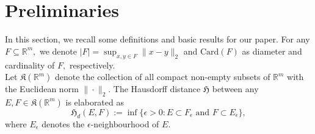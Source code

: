 \documentclass{amsproc}
\theoremstyle{definition}
\newtheorem{definition}[theorem]{Definition}
\theoremstyle{remark}
\numberwithin{equation}{section}
\begin{document}
\section{Preliminaries} \label{Sec2}
In this section, we recall some definitions and basic results for our paper. For any $F\subseteq\mathbb{R}^m,$ we denote $|F|=\sup_{x,y\in F}\|x-y\|_2$ and $\text{Card}(F)$ as diameter and cardinality of $F,$ respectively. \\
Let $\mathfrak{K}(\mathbb{R}^m)$ denote the collection of all compact non-empty subsets of $\mathbb{R}^m$ with the Euclidean norm $\|\cdot\|_2$. The Hausdorff distance $\mathfrak{H}$ between any $E,F\in\mathfrak{K}(\mathbb{R}^m)$ is elaborated as 
$$\mathfrak{H}_d(E,F):=\inf\{\epsilon>0: E\subset F_\epsilon \text{ and } F\subset E_\epsilon\},$$ where $E_\epsilon$ denotes the $\epsilon$-neighbourhood of $E.$
\end{document}
